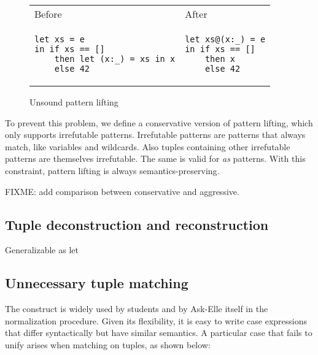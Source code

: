 \begin{figure}
\centering
\begin{tabular}{ >{\centering\arraybackslash}m{17em} >{\centering\arraybackslash}m{10em} }
Before & After \\
\begin{verbatim}
let xs = e
in if xs == []
    then let (x:_) = xs in x
    else 42
\end{verbatim}
& \begin{verbatim}
let xs@(x:_) = e
in if xs == []
    then x
    else 42
\end{verbatim}
\end{tabular}
\caption{Unsound pattern lifting}
\label{fig:pattern-lifting-unsound}
\end{figure}

To prevent this problem, we define a conservative version of pattern lifting, which only supports irrefutable patterns. Irrefutable patterns are patterns that always match, like variables and wildcards. Also tuples containing other irrefutable patterns are themselves irrefutable. The same is valid for \emph{as} patterns. With this constraint, pattern lifting is always semantics-preserving.

FIXME: add comparison between conservative and aggressive.

\subsection{Tuple deconstruction and reconstruction}



Generalizable as let

\subsection{Unnecessary tuple matching}

The  construct is widely used by students and by Ask-Elle itself in the normalization procedure. Given its flexibility, it is easy to write case expressions that differ syntactically but have similar semantics. A particular case that fails to unify arises when matching on tuples, as shown below:

